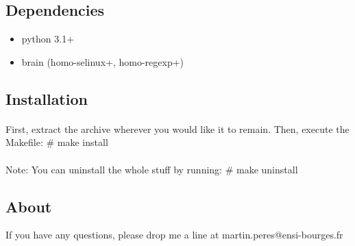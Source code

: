 \subsection*{Dependencies}
\begin{itemize}
 \item python 3.1+
 \item brain (homo-selinux+, homo-regexp+)
\end{itemize}

\subsection*{Installation}
\paragraph*{}
First, extract the archive wherever you would like it to remain.
Then, execute the Makefile: \# make install

\paragraph*{}
Note: You can uninstall the whole stuff by running: \# make uninstall

\subsection*{About}
If you have any questions, please drop me a line at martin.peres@ensi-bourges.fr